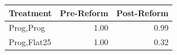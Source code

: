 \begin{tabular}{lrr}
\toprule
Treatment & Pre-Reform & Post-Reform \\
\midrule
Prog,Prog & 1.00 & 0.99 \\
Prog,Flat25 & 1.00 & 0.32 \\
\bottomrule
\end{tabular}

